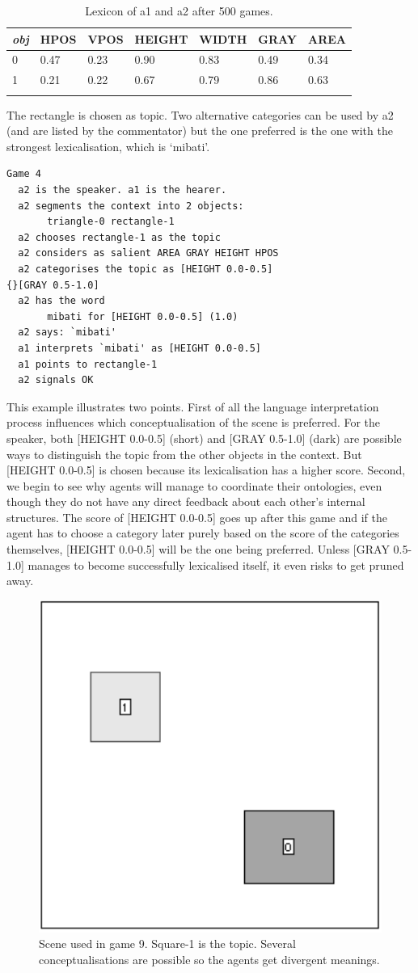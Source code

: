 \begin{table}
\begin{center}
\begin{tabular}{ l  l  l  l  l  l  l }
\lsptoprule
{\itshape obj} & HPOS & VPOS & HEIGHT & WIDTH & GRAY & AREA \\ \midrule
0 & 0.47 & 0.23 & 0.90 & 0.83 & 0.49 & 0.34\\ 
1 & 0.21 & 0.22 & 0.67 & 0.79 & 0.86 & 0.63\\ 
\lspbottomrule
\end{tabular}
\caption{\label{tab:mibati} Lexicon of a1 and a2 after 500 games.}
\end{center}
\end{table}
The rectangle is chosen as topic. Two alternative
categories can be used by {\bfshape  a2} (and are listed
by the commentator) but the one preferred
is the one with the strongest lexicalisation, which is 
`mibati'.
\begin{verbatim}
Game 4
  a2 is the speaker. a1 is the hearer. 
  a2 segments the context into 2 objects: 
       triangle-0 rectangle-1
  a2 chooses rectangle-1 as the topic 
  a2 considers as salient AREA GRAY HEIGHT HPOS 
  a2 categorises the topic as [HEIGHT 0.0-0.5] 
{}[GRAY 0.5-1.0]
  a2 has the word
       mibati for [HEIGHT 0.0-0.5] (1.0)
  a2 says: `mibati'
  a1 interprets `mibati' as [HEIGHT 0.0-0.5]
  a1 points to rectangle-1
  a2 signals OK 
\end{verbatim}

This example illustrates two points. First of all the 
language interpretation process influences 
which conceptualisation of the scene is preferred. For 
the speaker, both [HEIGHT 0.0-0.5] (short) and [GRAY 0.5-1.0]
(dark) are possible ways to distinguish the topic from the 
other objects in the context. But [HEIGHT 0.0-0.5] is 
chosen because its lexicalisation has a higher score. 
Second, we begin to see why agents will manage to 
coordinate their ontologies, even though they do not 
have any direct feedback about each other's internal 
structures. The score of [HEIGHT 0.0-0.5] goes up after
this game and if the 
agent has to choose a category later purely based on 
the score of the categories themselves, [HEIGHT 0.0-0.5] will 
be the one being preferred. Unless [GRAY 0.5-1.0] manages
to become successfully lexicalised itself, it even risks to 
get pruned away. 


\begin{figure}[htbp]
  \centerline{\includegraphics[width=.40\textwidth]{chap6/figs/scene-game9}}
\caption{\label{game9} Scene used
in game 9. Square-1 is the topic. Several conceptualisations are 
possible so the agents get divergent meanings.}
\end{figure}


